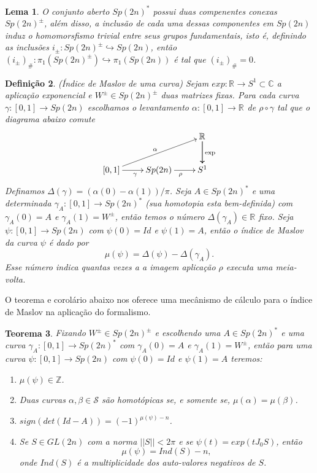 \documentclass[12pt]{book}
\newtheorem{teorema}{Teorema}[section]
\newtheorem{lema}[teorema]{Lema}
\newtheorem{definicao}[teorema]{Definição}
\newcommand{\estruturacomplexa}{J_{0}}
\newcommand{\inteiros}{\mathbb{Z}}
\newcommand{\real}[1]{\mathbb{R}^{#1}}
\begin{document}
	\begin{lema}
		O conjunto aberto $Sp(2n)^{*}$ possui duas compenentes conexas $Sp(2n)^{\pm}$, além disso, a inclusão de cada uma dessas componentes em $Sp(2n)$ induz o homomorsfismo trivial entre seus grupos fundamentais, isto é, definindo as inclusões $i_{\pm}:Sp(2n)^{\pm} \hookrightarrow Sp(2n)$, então $(i_{\pm})_{\#}:\pi_{1}(Sp(2n)^{\pm}) \hookrightarrow \pi_{1}(Sp(2n))$ é tal que $(i_{\pm})_{\#}=0$. 
	\end{lema}
	
	\begin{definicao}
		(Índice de Maslov de uma curva) Sejam $exp:\real{} \to S^{1} \subset \mathbb{C}$ a aplicação exponencial e $W^{\pm} \in Sp(2n)^{\pm}$ duas matrizes fixas. Para cada curva $\gamma:[0,1] \to Sp(2n)$ escolhamos o levantamento $\alpha:[0,1] \to \real{}$ de $\rho\circ \gamma$ tal que o diagrama abaixo comute
		$$
		\xymatrix{
			& & \real{}\ar[d]\ar[d]^{\text{exp}}
			\\
			[0,1 ]\ar[urr]^{\alpha} \ar[r]_{\gamma} & Sp(2n) \ar[r]_{\rho} & S^{1}
		}
		$$	
		Definamos $\varDelta(\gamma) = (\alpha(0) - \alpha(1))/\pi$. Seja $A \in Sp(2n)^{*}$ e uma determinada $\gamma_{A}:[0,1] \to Sp(2n)^{*}$ (sua homotopia esta bem-definida) com $\gamma_{A}(0) = A$ e $\gamma_{A}(1) = W^{\pm}$, então temos o número $\varDelta(\gamma_{A}) \in \real{}$ fixo.
		Seja $\psi:[0,1] \to Sp(2n)$ com $\psi(0)=Id$ e $\psi(1)=A$, então o índice de Maslov da curva $\psi$ é dado por
		$$
		\mu(\psi) = \varDelta(\psi) - \varDelta(\gamma_{A}).
		$$
		Esse número indica quantas vezes a a imagem aplicação $\rho$ executa uma meia-volta.
	\end{definicao}
	
	O teorema e corolário abaixo nos oferece uma mecânismo de cálculo para o índice de Maslov na aplicação do formalismo.
	
	\begin{teorema}
		Fixando $W^{\pm} \in Sp(2n)^{\pm}$ e escolhendo uma $A \in Sp(2n)^{*}$ e uma curva $\gamma_{A}:[0,1] \to Sp(2n)^{*}$ com $\gamma_{A}(0) = A$ e $\gamma_{A}(1) = W^{\pm}$, então para uma curva  $\psi:[0,1] \to Sp(2n)$ com $\psi(0) = Id$ e $\psi(1) = A$ teremos:
		\begin{enumerate}
			\item $\mu(\psi) \in \inteiros$.
			\item Duas curvas $\alpha, \beta \in \mathcal{S}$ são homotópicas se, e somente se, $\mu(\alpha) = \mu(\beta)$.
			\item $sign(det(Id - A)) = (-1)^{\mu(\psi)-n}$.
			\item Se $S \in GL(2n)$ com a norma $||S|| < 2\pi$ e se $\psi(t) = exp(t\estruturacomplexa S)$, então 
			$$
			\mu(\psi) = Ind(S) - n,
			$$
			onde $Ind(S)$ é a multiplicidade dos auto-valores negativos de $S$.
		\end{enumerate}
	\end{teorema}
	
\end{document}
